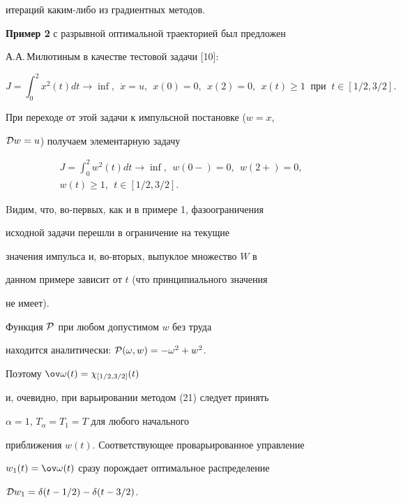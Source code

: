 итераций каким-либо из градиентных методов.


\medskip





{\bf Пример 2} с разрывной оптимальной траекторией был предложен


А.А.\,Милютиным в качестве тестовой задачи [10]:


$$


J = \int_0^2x^2(t)dt \to \inf, \ \


\Dot x = u, \ \ x(0)=0, \ \ x(2)=0,


\ \ x(t) \ge 1 \ \text{ при } \ t\in [1/2,3/2].


$$


При переходе от этой задачи к импульсной постановке ($w=x$,


${\cal D} w=u$) получаем элементарную задачу


\begin{gather*}


J = \int_0^2 w^2(t)dt \to \inf, \ \ w(0-)=0, \ \ w(2+)=0,\\


w(t) \ge 1, \ \ t\in [1/2,3/2].


\end{gather*}


Bидим, что, во-первых, как и в примере 1, фазоограничения


исходной задачи перешли в ограничение на текущие


значения импульса и, во-вторых, выпуклое множество $W$ в


данном примере зависит от $t$ (что принципиального значения


не имеет).





Функция $\cal P$ при любом допустимом $w$ без труда 


находится аналитически: ${\cal P}(\omega,w)=-\omega^2 + w^2$. 


Поэтому $\ov \omega (t) = \chi_{[1/2,3/2]}(t)$


и, очевидно, при варьировании методом (21) следует принять


$\alpha =1$, $T_\alpha = T_1 = T$ для любого начального 


приближения $w(t)$. Соответствующее проварьированное управление


$w_1(t)=\ov \omega(t)$ сразу порождает оптимальное распределение


${\cal D}w_1=\delta(t-1/2)-\delta(t-3/2)$.





